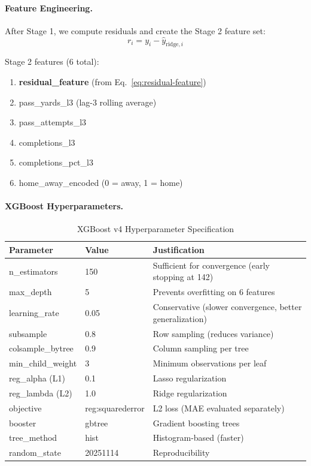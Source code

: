\paragraph{Feature Engineering.}
After Stage 1, we compute residuals and create the Stage 2 feature set:
\begin{equation}
\label{eq:residual-feature}
r_i = y_i - \hat{y}_{\text{ridge},i}
\end{equation}

\noindent Stage 2 features (6 total):
\begin{enumerate}[itemsep=1pt,parsep=0pt]
    \item \textbf{residual\_feature} (from Eq.~\ref{eq:residual-feature})
    \item pass\_yards\_l3 (lag-3 rolling average)
    \item pass\_attempts\_l3
    \item completions\_l3
    \item completions\_pct\_l3
    \item home\_away\_encoded (0 = away, 1 = home)
\end{enumerate}

\paragraph{XGBoost Hyperparameters.}
\begin{table}[htbp]
\centering
\caption{XGBoost v4 Hyperparameter Specification}
\label{tab:xgboost-hyperparameters}
\small
\begin{tabular}{@{} l l l @{}}
\toprule
\textbf{Parameter} & \textbf{Value} & \textbf{Justification} \\
\midrule
n\_estimators & 150 & Sufficient for convergence (early stopping at 142) \\
max\_depth & 5 & Prevents overfitting on 6 features \\
learning\_rate & 0.05 & Conservative (slower convergence, better generalization) \\
subsample & 0.8 & Row sampling (reduces variance) \\
colsample\_bytree & 0.9 & Column sampling per tree \\
min\_child\_weight & 3 & Minimum observations per leaf \\
reg\_alpha (L1) & 0.1 & Lasso regularization \\
reg\_lambda (L2) & 1.0 & Ridge regularization \\
objective & reg:squarederror & L2 loss (MAE evaluated separately) \\
booster & gbtree & Gradient boosting trees \\
tree\_method & hist & Histogram-based (faster) \\
random\_state & 20251114 & Reproducibility \\
\bottomrule
\end{tabular}
\end{table}


